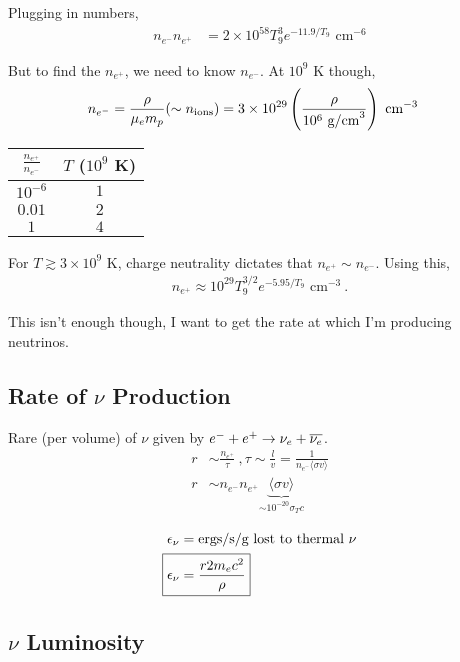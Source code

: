Plugging in numbers, 
\begin{align}
n_{e^-}  n_{e^+} &= 2 \times 10^{58} T_9^3 e^{-11.9/T_9}\textrm{ cm}^{-6}
\end{align}

But to find the $n_{e^+}$, we need to know $n_{e^-}$. At $10^9$ K though, 
\begin{align}
n_{e^-} &= \frac{\rho}{\mu_e m_p} (\sim n_{\textrm{ions}})= 3 \times 10^{29} \left( \frac{\rho}{10^6 \textrm{ g/cm}^3}\right) \textrm{ cm}^{-3}
\end{align}

\begin{center}
\begin{tabular}{c|c}
\hline
$\frac{n_{e^+}}{n_{e^-}}$ & $T$ ($10^9$ K)\\ \hline
$10^{-6}$& $1$\\ \hline
$0.01$ & $2$\\ \hline
$1$ & $4$\\
\hline
\end{tabular}
\end{center}
For $T \gtrsim 3 \times 10^9$ K, charge neutrality dictates that $n_{e^+} \sim n_{e^-}$. Using this, 
\begin{align}
\boxed{n_{e^+}\approx 10^{29}T_9^{3/2} e^{-5.95/T_9}\textrm{ cm}^{-3}}~.
\end{align}

This isn't enough though, I want to get the rate at which I'm producing neutrinos. 

\subsection{Rate of $\nu$ Production}

Rare (per volume) of $\nu$ given by $e^- + e^+ \rightarrow \nu_e + \overline{\nu_e} $.
\begin{align}
r &\sim \frac{n_{e^+}}{\tau}~,\tau \sim \frac{l}{v} = \frac{1}{n_{e^-}\langle \sigma v\rangle }\\
r &\sim n_{e^-}n_{e^+}\underbrace{\langle \sigma v\rangle }_{\sim 10^{-20} \sigma_T c}
\end{align}

\begin{align}
\epsilon_\nu &= \textrm{ergs/s/g lost to thermal $\nu$}\\
\Aboxed{\epsilon_{\nu} &= \frac{r2m_ec^2}{\rho}}
\end{align}

\subsection{$\nu$ Luminosity}

